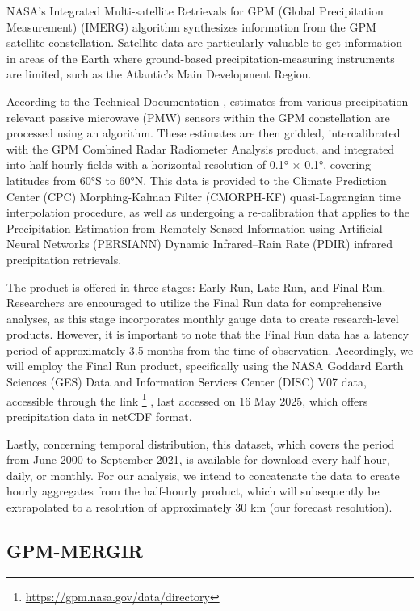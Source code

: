 NASA’s Integrated Multi-satellite Retrievals for GPM (Global Precipitation Measurement) (IMERG) \cite{huffman2019gpm} algorithm synthesizes information from the GPM satellite constellation. Satellite data are particularly valuable to get information in areas of the Earth where ground-based precipitation-measuring instruments are limited, such as the Atlantic’s Main Development Region.

According to the Technical Documentation %
, estimates from various precipitation-relevant passive microwave (PMW) sensors within the GPM constellation are processed using an algorithm. These estimates are then gridded, intercalibrated with the GPM Combined Radar Radiometer Analysis product, and integrated into half-hourly fields with a horizontal resolution of 0.1° × 0.1°, covering latitudes from 60°S to 60°N. This data is provided to the Climate Prediction Center (CPC) Morphing-Kalman Filter (CMORPH-KF) quasi-Lagrangian time interpolation procedure, as well as undergoing a re-calibration that applies to the Precipitation Estimation from Remotely Sensed Information using Artificial Neural Networks (PERSIANN) Dynamic Infrared–Rain Rate (PDIR) infrared precipitation retrievals.

The product is offered in three stages: Early Run, Late Run, and Final Run. Researchers are encouraged to utilize the Final Run data for comprehensive analyses, as this stage incorporates monthly gauge data to create research-level products. However, it is important to note that the Final Run data has a latency period of approximately 3.5 months from the time of observation. Accordingly, we will employ the Final Run product, specifically using the NASA Goddard Earth Sciences (GES) Data and Information Services Center (DISC) V07 data, accessible through the link 
\footnote{\url{https://gpm.nasa.gov/data/directory}}
, last accessed on 16 May 2025, which offers precipitation data in netCDF format.

Lastly, concerning temporal distribution, this dataset, which covers the period from June 2000 to September 2021, is available for download every half-hour, daily, or monthly. For our analysis, we intend to concatenate the data to create hourly aggregates from the half-hourly product, which will subsequently be extrapolated to a resolution of approximately 30 km (our forecast resolution).


\subsection{GPM-MERGIR}

